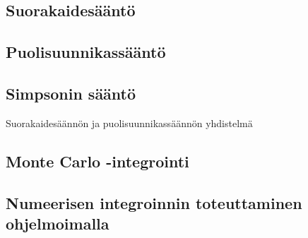\documentclass[../integrointiopas.tex]{subfiles}
\begin{document}
	\subsection{Suorakaidesääntö}
	
	\subsection{Puolisuunnikassääntö}
	
	\subsection{Simpsonin sääntö}
	
	Suorakaidesäännön ja puolisuunnikassäännön yhdistelmä
	
	\subsection{Monte Carlo -integrointi}
	
	\subsection{Numeerisen integroinnin toteuttaminen ohjelmoimalla}
\end{document}
